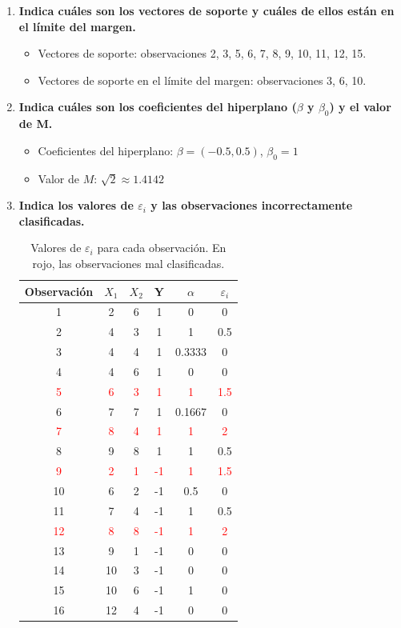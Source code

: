 \documentclass[11pt]{article}
\begin{document}
\begin{enumerate}
\item \textbf{Indica cuáles son los vectores de soporte y cuáles de ellos están en el límite del margen.}
\begin{itemize}
\item Vectores de soporte: observaciones 2, 3, 5, 6, 7, 8, 9, 10, 11, 12, 15.
\item Vectores de soporte en el límite del margen: observaciones 3, 6, 10.
\end{itemize}
\item \textbf{Indica cuáles son los coeficientes del hiperplano ($\beta$ y $\beta_0$) y el valor de M.}
\begin{itemize}
\item Coeficientes del hiperplano: $\beta = (-0.5, 0.5)$, $\beta_0 = 1$
\item Valor de $M$: $\sqrt{2} \approx 1.4142$
\end{itemize}
\item \textbf{Indica los valores de $\varepsilon_i$ y las observaciones incorrectamente clasificadas.}
\begin{table}[H]
\centering
\begin{tabular}{cccccc}
\toprule
Observación & $X_1$ & $X_2$ & Y & $\alpha$ & $\varepsilon_i$ \\
\toprule
1 & 2 & 6 & 1 & 0 & 0 \\
2 & 4 & 3 & 1 & 1 & 0.5 \\
3 & 4 & 4 & 1 & 0.3333 & 0 \\
4 & 4 & 6 & 1 & 0 & 0 \\
\textcolor{red}{5} & \textcolor{red}{6} & \textcolor{red}{3} & \textcolor{red}{1} & \textcolor{red}{1} & \textcolor{red}{1.5} \\
6 & 7 & 7 & 1 & 0.1667 & 0 \\
\textcolor{red}{7} & \textcolor{red}{8} & \textcolor{red}{4} & \textcolor{red}{1} & \textcolor{red}{1} & \textcolor{red}{2} \\
8 & 9 & 8 & 1 & 1 & 0.5 \\
\textcolor{red}{9} & \textcolor{red}{2} & \textcolor{red}{1} & \textcolor{red}{-1} & \textcolor{red}{1} & \textcolor{red}{1.5} \\
10 & 6 & 2 & -1 & 0.5 & 0 \\
11 & 7 & 4 & -1 & 1 & 0.5 \\
\textcolor{red}{12} & \textcolor{red}{8} & \textcolor{red}{8} & \textcolor{red}{-1} & \textcolor{red}{1} & \textcolor{red}{2} \\
13 & 9 & 1 & -1 & 0 & 0 \\
14 & 10 & 3 & -1 & 0 & 0 \\
15 & 10 & 6 & -1 & 1 & 0 \\
16 & 12 & 4 & -1 & 0 & 0 \\
\toprule
\end{tabular}
\caption{Valores de $\varepsilon_i$ para cada observación. En rojo, las observaciones mal clasificadas.}
\label{tab:2}
\end{table}
\end{enumerate}
\end{document}
